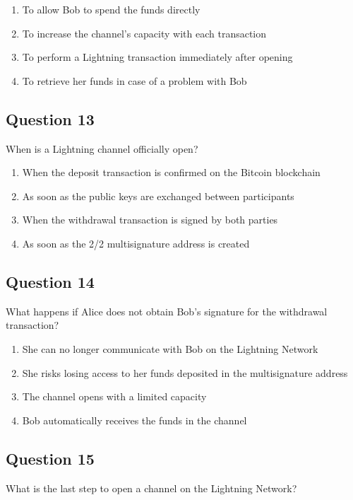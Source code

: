 \documentclass[12pt,a4paper]{article}
\begin{document}
\begin{enumerate}[label=\Alph*., leftmargin=*]
\item To allow Bob to spend the funds directly
\item To increase the channel's capacity with each transaction
\item To perform a Lightning transaction immediately after opening
\item To retrieve her funds in case of a problem with Bob
\end{enumerate}

\bigskip


\subsection*{Question 13}
When is a Lightning channel officially open?

\begin{enumerate}[label=\Alph*., leftmargin=*]
\item When the deposit transaction is confirmed on the Bitcoin blockchain
\item As soon as the public keys are exchanged between participants
\item When the withdrawal transaction is signed by both parties
\item As soon as the 2/2 multisignature address is created
\end{enumerate}

\bigskip


\subsection*{Question 14}
What happens if Alice does not obtain Bob's signature for the withdrawal transaction?

\begin{enumerate}[label=\Alph*., leftmargin=*]
\item She can no longer communicate with Bob on the Lightning Network
\item She risks losing access to her funds deposited in the multisignature address
\item The channel opens with a limited capacity
\item Bob automatically receives the funds in the channel
\end{enumerate}

\bigskip


\subsection*{Question 15}
What is the last step to open a channel on the Lightning Network?
\end{document}
